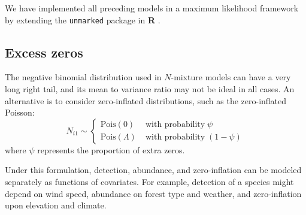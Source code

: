 \documentclass[12pt]{article}
\begin{document}
We have implemented all preceding models in
a maximum likelihood framework by extending the
\texttt{unmarked} package
\citep{fiske_chandler:2011} in \textbf{R} \citep{R-2012}.


\subsection{Excess zeros}

The negative binomial distribution used in $N$-mixture models can have
a very long right tail, and its mean to variance ratio may not be
ideal in all cases. An alternative is to consider zero-inflated
distributions, such as the zero-inflated Poisson:
\begin{equation}
N_{i1} \sim \left\{
\begin{aligned}
\mbox{Pois}(0) &\; \text{with probability} \; \psi \\
\mbox{Pois}(\Lambda) &\; \text{with probability} \; (1-\psi)
\end{aligned} \right.
\label{eq:ZIP}
\end{equation}
where $\psi$ represents the proportion of extra zeros.

Under this formulation, 
detection, abundance, and zero-inflation can be modeled separately as
functions of covariates. For example, detection of a
species might depend on wind speed,
abundance on forest type and weather, and zero-inflation upon elevation and
climate.  
\end{document}

